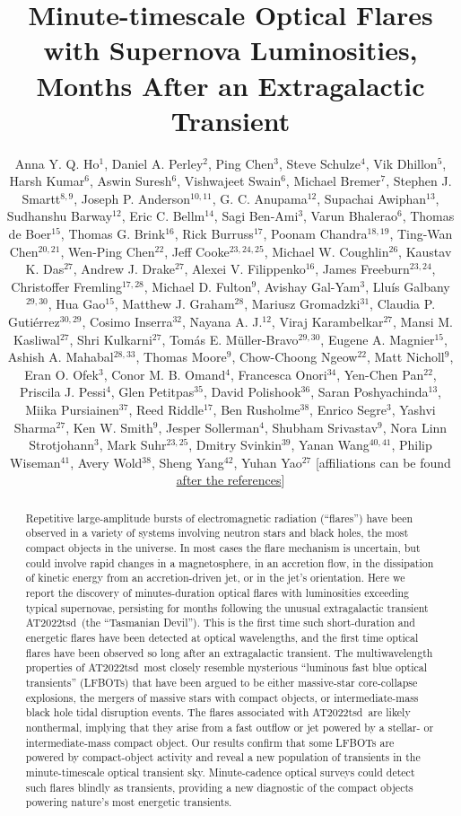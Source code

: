 \documentclass{nature_plusfigure}
\title{Minute-timescale Optical Flares with Supernova Luminosities, Months After an Extragalactic Transient}
\author{Anna Y. Q. Ho$^{1}$, Daniel A. Perley$^{2}$, Ping Chen$^{3}$, Steve Schulze$^{4}$, Vik Dhillon$^{5}$, Harsh Kumar$^{6}$, Aswin Suresh$^{6}$, Vishwajeet Swain$^{6}$, Michael Bremer$^{7}$, Stephen J. Smartt$^{8,9}$, Joseph P. Anderson$^{10,11}$, G. C. Anupama$^{12}$, Supachai Awiphan$^{13}$, Sudhanshu Barway$^{12}$, Eric C. Bellm$^{14}$, Sagi Ben-Ami$^{3}$, Varun Bhalerao$^{6}$, Thomas de Boer$^{15}$, Thomas G. Brink$^{16}$, Rick Burruss$^{17}$, Poonam Chandra$^{18,19}$, Ting-Wan Chen$^{20,21}$, Wen-Ping Chen$^{22}$, Jeff Cooke$^{23,24,25}$, Michael W. Coughlin$^{26}$, Kaustav K. Das$^{27}$, Andrew J. Drake$^{27}$, Alexei V. Filippenko$^{16}$, James Freeburn$^{23,24}$, Christoffer Fremling$^{17,28}$, Michael D. Fulton$^{9}$, Avishay Gal-Yam$^{3}$, Llu\'is Galbany$^{29,30}$, Hua Gao$^{15}$, Matthew J. Graham$^{28}$, Mariusz Gromadzki$^{31}$, Claudia P. Guti\'errez$^{30,29}$, Cosimo Inserra$^{32}$, Nayana A. J.$^{12}$, Viraj Karambelkar$^{27}$, Mansi M. Kasliwal$^{27}$, Shri Kulkarni$^{27}$, Tom\'as E. M\"uller-Bravo$^{29,30}$, Eugene A. Magnier$^{15}$, Ashish A. Mahabal$^{28,33}$, Thomas Moore$^{9}$, Chow-Choong Ngeow$^{22}$, Matt Nicholl$^{9}$, Eran O. Ofek$^{3}$, Conor M. B. Omand$^{4}$, Francesca Onori$^{34}$, Yen-Chen Pan$^{22}$, Priscila J. Pessi$^{4}$, Glen Petitpas$^{35}$, David Polishook$^{36}$, Saran Poshyachinda$^{13}$, Miika Pursiainen$^{37}$, Reed Riddle$^{17}$, Ben Rusholme$^{38}$, Enrico Segre$^{3}$, Yashvi Sharma$^{27}$, Ken W. Smith$^{9}$, Jesper Sollerman$^{4}$, Shubham Srivastav$^{9}$, Nora Linn Strotjohann$^{3}$, Mark Suhr$^{23,25}$, Dmitry Svinkin$^{39}$, Yanan Wang$^{40,41}$, Philip Wiseman$^{41}$, Avery Wold$^{38}$, Sheng Yang$^{42}$, Yuhan Yao$^{27}$
[affiliations can be found \hyperref[sec:affiliations]{after the references}]
	}
\newcommand{\at}{AT2022tsd}
\begin{document}
\maketitle

\begin{abstract}

Repetitive large-amplitude bursts of electromagnetic radiation (``flares'') have been observed in a variety of systems involving neutron stars and black holes\cite{Fender1997,Hurley1999,Marrone2008,Racusin2008,Kasliwal2008,CastroTirado2008,Stefanescu2008,Nesci2021}, the most compact objects in the universe. In most cases the flare mechanism is uncertain, but could involve rapid changes in a magnetosphere\cite{Hurley1999,CastroTirado2008,Stefanescu2008}, in an accretion flow\cite{Fender2004,Yuan2014}, in the dissipation of kinetic energy from an accretion-driven jet\cite{Racusin2008}, or in the jet's orientation\cite{Raiteri2017}.
Here we report the discovery of minutes-duration optical flares with luminosities exceeding typical supernovae, persisting for months following the unusual extragalactic transient \at\ (the ``Tasmanian Devil'').
This is the first time such short-duration and energetic flares have been detected at optical wavelengths, and the first time optical flares have been observed so long after an extragalactic transient.
The multiwavelength properties of \at\ most closely resemble mysterious ``luminous fast blue optical transients'' (LFBOTs\cite{Prentice2018,RiveraSandoval2018,Perley2019,Margutti2019,Ho2019,Coppejans2020,Ho2020_Koala,Perley2021,Bright2022,Ho2022_AT2020xnd,Yao2022}) that have been argued to be either massive-star core-collapse explosions\cite{Prentice2018,Margutti2019,Perley2019}, the mergers of massive stars with compact objects\cite{Metzger2022}, or intermediate-mass black hole tidal disruption events\cite{Kuin2019,Perley2019}. The flares associated with \at\ are likely nonthermal, implying that they arise from a fast outflow or jet powered by a stellar- or intermediate-mass compact object.
Our results confirm that some LFBOTs are powered by compact-object activity
and reveal a new population of transients in the minute-timescale optical transient sky.
Minute-cadence optical surveys\cite{Ofek2023,Law2022} could detect such flares blindly as transients,
providing a new diagnostic of the compact objects powering nature's most energetic transients.

\end{abstract}
\end{document}
